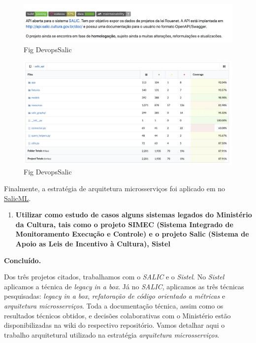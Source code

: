 \begin{figure}
\centering
\includegraphics{figs/salicapi2.png}
\caption{Fig DevopsSalic}
\end{figure}

\begin{figure}
\centering
\includegraphics{figs/salicapi1.png}
\caption{Fig DevopsSalic}
\end{figure}

Finalmente, a estratégia de arquitetura microsserviços foi aplicado em
no \href{https://github.com/lappis-unb/salic-ml}{SalicML}.

\begin{enumerate}
\def\labelenumi{\arabic{enumi}.}
\setcounter{enumi}{2}
\tightlist
\item
  \textbf{Utilizar como estudo de casos alguns sistemas legados do
  Ministério da Cultura, tais como o projeto SIMEC (Sistema Integrado de
  Monitoramento Execução e Controle) e o projeto Salic (Sistema de Apoio
  as Leis de Incentivo à Cultura), Sistel}
\end{enumerate}

\textbf{Concluído.}

Dos três projetos citados, trabalhamos com o \emph{SALIC} e o
\emph{Sistel}. No \emph{Sistel} aplicamos a técnica de \emph{legacy in a
box}. Já no \emph{SALIC}, aplicamos as três técnicas pesquisadas:
\emph{legacy in a box}, \emph{refatoração de código orientado a
métricas} e \emph{arquitetura microsserviços}. Toda a documentação
técnica, assim como os resultados técnicos obtidos, e decisões
colaborativas com o Ministério estão disponibilizadas na wiki do
respectivo repositório. Vamos detalhar aqui o trabalho arquitetural
utilizado na estratégia \emph{arquitetura microsserviços}.


